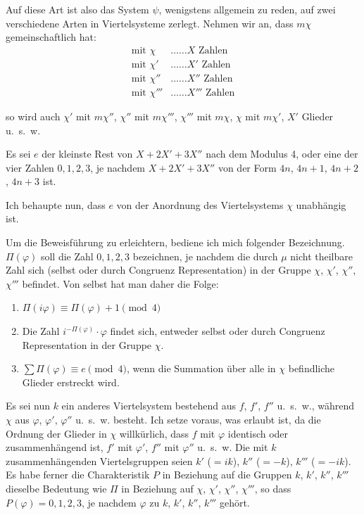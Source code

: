 \documentclass[12pt,a4paper]{article}
\begin{document}
Auf diese Art ist also das System $\psi$, wenigstens allgemein zu reden, auf zwei verschiedene Arten in Viertelsysteme zerlegt. Nehmen wir an, dass $m\chi$ gemeinschaftlich hat:
\begin{align*}
\text{mit } \chi &\ldots\ldots X \text{ Zahlen}\\
\text{mit } \chi' &\ldots\ldots X' \text{ Zahlen}\\
\text{mit } \chi'' &\ldots\ldots X'' \text{ Zahlen}\\
\text{mit } \chi''' &\ldots\ldots X''' \text{ Zahlen}
\end{align*}

so wird auch $\chi'$ mit $m\chi''$, $\chi''$ mit $m\chi'''$, $\chi'''$ mit $m\chi$, $\chi$ mit $m\chi'$, $X'$ Glieder u.~s.~w.

Es sei $e$ der kleinste Rest von $X + 2X' + 3X''$ nach dem Modulus 4, oder eine der vier Zahlen $0, 1, 2, 3$, je nachdem $X + 2X' + 3X''$ von der Form $4n$, $4n+1$, $4n+2$, $4n+3$ ist.

Ich behaupte nun, dass $e$ von der Anordnung des Viertelsystems $\chi$ unabhängig ist.

Um die Beweisführung zu erleichtern, bediene ich mich folgender Bezeichnung. $\Pi(\varphi)$ soll die Zahl $0, 1, 2, 3$ bezeichnen, je nachdem die durch $\mu$ nicht theilbare Zahl sich (selbst oder durch Congruenz Representation) in der Gruppe $\chi$, $\chi'$, $\chi''$, $\chi'''$ befindet. Von selbst hat man daher die Folge:
\begin{enumerate}[label=\Roman*.]
\item $\Pi(i\varphi) \equiv \Pi(\varphi) + 1 \pmod{4}$
\item Die Zahl $i^{-\Pi(\varphi)} \cdot \varphi$ findet sich, entweder selbst oder durch Congruenz Representation in der Gruppe $\chi$.
\item $\sum \Pi(\varphi) \equiv e \pmod{4}$, wenn die Summation über alle in $\chi$ befindliche Glieder erstreckt wird.
\end{enumerate}

Es sei nun $k$ ein anderes Viertelsystem bestehend aus $f$, $f'$, $f''$ u.~s.~w., während $\chi$ aus $\varphi$, $\varphi'$, $\varphi''$ u.~s.~w. besteht. Ich setze voraus, was erlaubt ist, da die Ordnung der Glieder in $\chi$ willkürlich, dass $f$ mit $\varphi$ identisch oder zusammenhängend ist, $f'$ mit $\varphi'$, $f''$ mit $\varphi''$ u.~s.~w. Die mit $k$ zusammenhängenden Viertelsgruppen seien $k'$ ($=ik$), $k''$ ($=-k$), $k'''$ ($=-ik$). Es habe ferner die Charakteristik $P$ in Beziehung auf die Gruppen $k$, $k'$, $k''$, $k'''$ dieselbe Bedeutung wie $\Pi$ in Beziehung auf $\chi$, $\chi'$, $\chi''$, $\chi'''$, so dass $P(\varphi) = 0, 1, 2, 3$, je nachdem $\varphi$ zu $k$, $k'$, $k''$, $k'''$ gehört.
\end{document}

